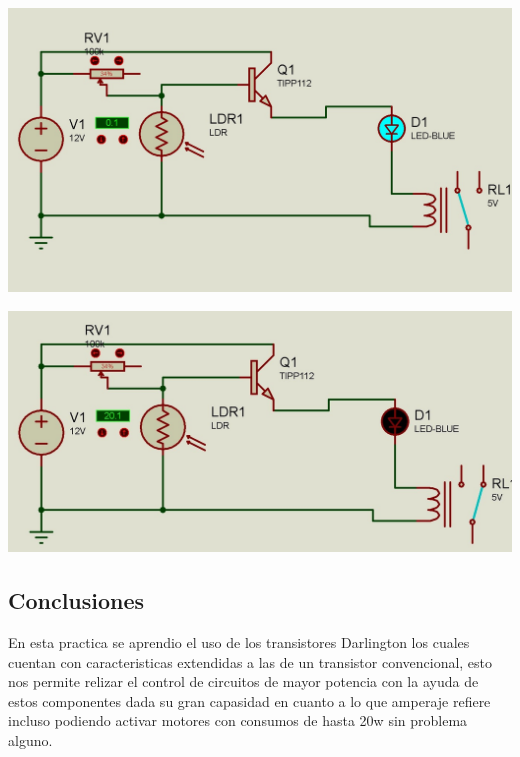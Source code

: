 \documentclass[12pt,a4paper]{article}
\begin{document}
\begin{flushleft}
\begin{center}
\includegraphics[scale=0.25]{imagenes/circuito0.JPG} \linebreak


\includegraphics[scale=0.25]{imagenes/circuito1.JPG}
\end{center}
\end{flushleft}
\newpage
\subsection{Conclusiones}
\begin{flushleft}
En esta practica se aprendio el uso de los transistores Darlington los cuales cuentan con caracteristicas extendidas a las de un transistor convencional, esto nos permite relizar el control de circuitos de mayor potencia con la ayuda de estos componentes dada su gran capasidad en cuanto a lo que amperaje refiere incluso podiendo activar motores con consumos de hasta 20w sin problema alguno.
\end{flushleft}
\end{document}
